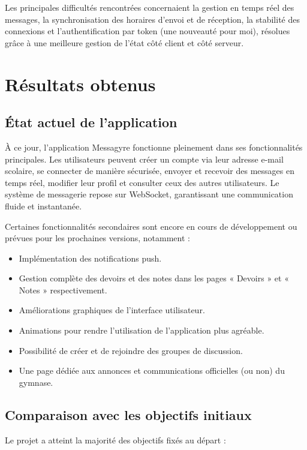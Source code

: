 \documentclass[12pt]{report}
\begin{document}
Les principales difficultés rencontrées concernaient la gestion en temps réel des messages, la synchronisation des horaires d'envoi et de réception, la stabilité des connexions et l'authentification par token (une nouveauté pour moi), résolues grâce à une meilleure gestion de l'état côté client et côté serveur.

\chapter{Résultats obtenus}

\section{État actuel de l'application}

À ce jour, l'application Messagyre fonctionne pleinement dans ses fonctionnalités principales. Les utilisateurs peuvent créer un compte via leur adresse e-mail scolaire, se connecter de manière sécurisée, envoyer et recevoir des messages en temps réel, modifier leur profil et consulter ceux des autres utilisateurs. Le système de messagerie repose sur WebSocket, garantissant une communication fluide et instantanée.

Certaines fonctionnalités secondaires sont encore en cours de développement ou prévues pour les prochaines versions, notamment :

\begin{itemize}
	\item Implémentation des notifications push.
	\item Gestion complète des devoirs et des notes dans les pages « Devoirs » et « Notes » respectivement.
	\item Améliorations graphiques de l’interface utilisateur.
	\item Animations pour rendre l’utilisation de l’application plus agréable.
	\item Possibilité de créer et de rejoindre des groupes de discussion.
	\item Une page dédiée aux annonces et communications officielles (ou non) du gymnase.
\end{itemize}

\section{Comparaison avec les objectifs initiaux}

Le projet a atteint la majorité des objectifs fixés au départ :
\end{document}
